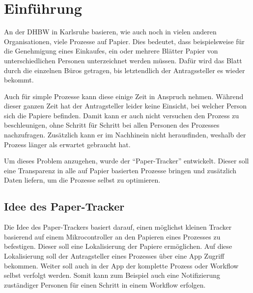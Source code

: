 \chapter{Einführung}

An der \gls{DHBW} in Karlsruhe basieren, wie auch noch in vielen anderen Organisationen, viele Prozesse auf Papier.
Dies bedeutet, dass beispielsweise für die Genehmigung eines Einkaufes, ein oder mehrere Blätter Papier von unterschiedlichen Personen unterzeichnet werden müssen.
Dafür wird das Blatt durch die einzelnen Büros getragen, bis letztendlich der Antragssteller es wieder bekommt.

Auch für simple Prozesse kann diese einige Zeit in Anspruch nehmen.
Während dieser ganzen Zeit hat der Antragsteller leider keine Einsicht, bei welcher Person sich die Papiere befinden.
Damit kann er auch nicht versuchen den Prozess zu beschleunigen, ohne Schritt für Schritt bei allen Personen des Prozesses nachzufragen.
Zusätzlich kann er im Nachhinein nicht herausfinden, weshalb der Prozess länger als erwartet gebraucht hat.

Um dieses Problem anzugehen, wurde der \enquote{Paper-Tracker} entwickelt.
Dieser soll eine Transparenz in alle auf Papier basierten Prozesse bringen und zusätzlich Daten liefern, um die Prozesse selbst zu optimieren.

\section{Idee des Paper-Tracker}

Die Idee des Paper-Trackers basiert darauf, einen möglichst kleinen Tracker basierend auf einem Mikrocontroller an den Papieren eines Prozesses zu befestigen.
Dieser soll eine Lokalisierung der Papiere ermöglichen.
Auf diese Lokalisierung soll der Antragsteller eines Prozesses über eine App Zugriff bekommen.
Weiter soll auch in der App der komplette Prozess oder Workflow selbst verfolgt werden.
Somit kann zum Beispiel auch eine Notifizierung zuständiger Personen für einen Schritt in einem Workflow erfolgen.
